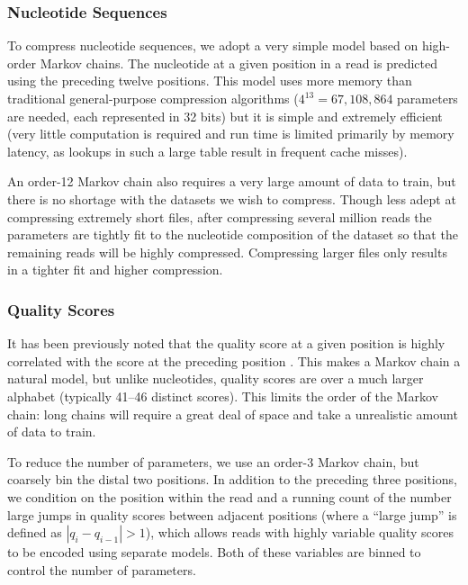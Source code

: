 \documentclass[a4,center,fleqn]{NAR}
\begin{document}
\subsubsection{Nucleotide Sequences}

To compress nucleotide sequences, we adopt a very simple model based on high-order
Markov chains. The nucleotide at a given position in a read is predicted
using the preceding twelve positions. This model uses more memory than
traditional general-purpose compression algorithms ($4^{13} = 67,108,864$
parameters are needed, each represented in 32 bits)  but it is simple and
extremely efficient (very little computation is required and run time is
limited primarily by memory latency, as lookups in such a large table result
in frequent cache misses).

An order-12 Markov chain also requires a very large amount of
data to train, but there is no shortage with the datasets we wish to
compress. Though less adept at compressing extremely short files,
after compressing several million reads the parameters are tightly
fit to the nucleotide composition of the dataset so that the remaining reads
will be highly compressed. Compressing larger files only results in a tighter
fit and higher compression.


\subsubsection{Quality Scores}

It has been previously noted that the quality score at a given position is
highly correlated with the score at the preceding position
\citep{Kozanitis2011}. This makes a Markov chain a natural model, but unlike
nucleotides, quality scores are over a much larger alphabet (typically 41--46
distinct scores). This limits the order of the Markov chain: long chains will
require a great deal of space and take a unrealistic amount of data to train.

To reduce the number of parameters, we use an order-3 Markov chain, but
coarsely bin the distal two positions. In addition to the preceding three
positions, we condition on the position within the read and a running count of
the number large jumps in quality scores between adjacent positions (where
a ``large jump'' is defined as $|q_{i} - q_{i-1}| > 1$), which allows reads
with highly variable quality scores to be encoded using separate models. Both
of these variables are binned to control the number of parameters.
\end{document}

